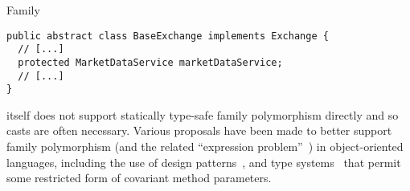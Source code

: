 \begin{pattern}{Family}
\begin{verbatim}
public abstract class BaseExchange implements Exchange {
  // [...]
  protected MarketDataService marketDataService;
  // [...]
}
\end{verbatim}

\discussion{}
\java{} itself does not support statically type-safe family polymorphism directly
and so casts are often necessary. Various proposals have been made to better
support family polymorphism (and the related ``expression
problem''~\cite{Wadler98ExpressionProblem}) in object-oriented languages, including
the use of design patterns~\cite{WangOliveira16ExpressionProblem, oliveiraExtensibilityMasses2012, nystromPolyglotExtensibleCompiler2003},
and type systems~\cite{gbeta, scalaIndependentlyExtensible,
Myers2006SoftwareCW, olivieraDisjointIntersectionTypes,
funWithTypeFunctionsKiselyov09} that
permit some restricted form of covariant method parameters.

\end{pattern}
